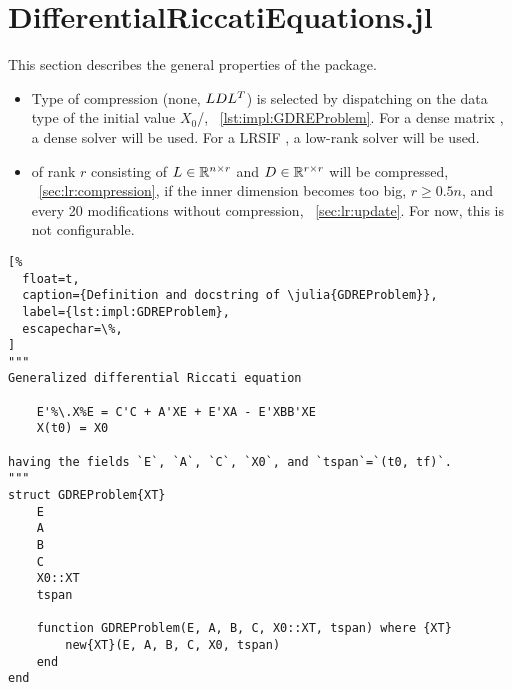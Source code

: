 \section{DifferentialRiccatiEquations.jl}

This section describes the general properties of the  package.

\begin{itemize}
  \item
    Type of compression (none, $LDL^T$) is selected by dispatching on the data type of the initial value $X_0$/,
    \cf~\autoref{lst:impl:GDREProblem}.
    For a dense matrix , a dense solver will be used.
    For a \ac{LRSIF} , a low-rank solver will be used.
  \item
     of rank $r$ consisting of $L \in\mathbb{R}^{n\times r}$ and $D\in\mathbb{R}^{r\times r}$ will be compressed,
    \cf~\autoref{sec:lr:compression},
    if the inner dimension becomes too big, $r \geq 0.5 n$,
    and every 20 modifications without compression,
    \cf~\autoref{sec:lr:update}.
    For now, this is not configurable.
\end{itemize}

\begin{lstlisting}[%
  float=t,
  caption={Definition and docstring of \julia{GDREProblem}},
  label={lst:impl:GDREProblem},
  escapechar=\%,
]
"""
Generalized differential Riccati equation

    E'%\.X%E = C'C + A'XE + E'XA - E'XBB'XE
    X(t0) = X0

having the fields `E`, `A`, `C`, `X0`, and `tspan`=`(t0, tf)`.
"""
struct GDREProblem{XT}
    E
    A
    B
    C
    X0::XT
    tspan

    function GDREProblem(E, A, B, C, X0::XT, tspan) where {XT}
        new{XT}(E, A, B, C, X0, tspan)
    end
end
\end{lstlisting}
